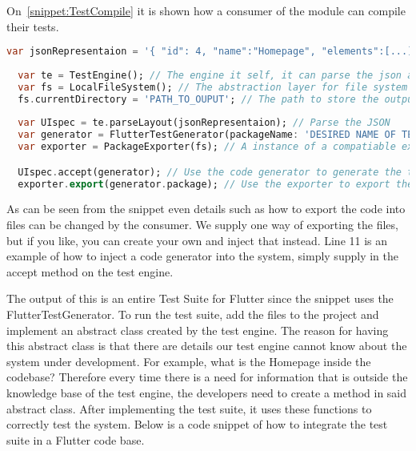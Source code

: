 On~\autoref{snippet:TestCompile} it is shown how a consumer of the module can compile their tests.

\begin{lstlisting}[language=dart, caption={How to configure and use the Test Generator Package.}, label={snippet:TestCompile}]
  var jsonRepresentaion = '{ "id": 4, "name":"Homepage", "elements":[...]}'; //The output from the tablet application
  
  var te = TestEngine(); // The engine it self, it can parse the json and use a codegenerator
  var fs = LocalFileSystem(); // The abstraction layer for file system
  fs.currentDirectory = 'PATH_TO_OUPUT'; // The path to store the output test suite
  
  var UIspec = te.parseLayout(jsonRepresentaion); // Parse the JSON
  var generator = FlutterTestGenerator(packageName: 'DESIRED NAME OF TEST PACKAGE'); // An instance of a compatiable code generator
  var exporter = PackageExporter(fs); // A instance of a compatiable exporter.

  UIspec.accept(generator); // Use the code generator to generate the test suite
  exporter.export(generator.package); // Use the exporter to export the test suite to the file system.
\end{lstlisting}

As can be seen from the snippet even details such as how to export the code into files can be changed by the consumer. 
We supply one way of exporting the files, but if you like, you can create your own and inject that instead. 
Line 11 is an example of how to inject a code generator into the system, simply supply in the accept method on the test engine.

The output of this is an entire Test Suite for Flutter since the snippet uses the FlutterTestGenerator. 
To run the test suite, add the files to the project and implement an abstract class created by the test engine. 
The reason for having this abstract class is that there are details our test engine cannot know about the system under development.
For example, what is the Homepage inside the codebase?
Therefore every time there is a need for information that is outside the knowledge base of the test engine, the developers need to create a method in said abstract class. 
After implementing the test suite, it uses these functions to correctly test the system.
Below is a code snippet of how to integrate the test suite in a Flutter code base.

